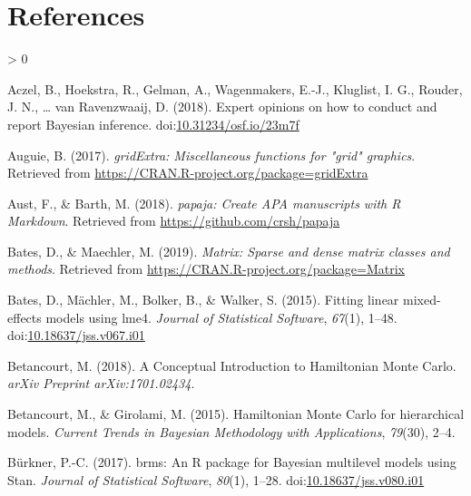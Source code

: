\documentclass[
  english,
  doc,floatsintext]{apa6}
\newlength{\cslhangindent}
\newenvironment{CSLReferences}[2] %
 {%
  \setlength{\parindent}{0pt}
  \ifodd #1 \everypar{\setlength{\hangindent}{\cslhangindent}}\ignorespaces\fi
  \ifnum #2 > 0
  \setlength{\parskip}{#2\baselineskip}
  \fi
 }%
 {}
\begin{document}
\newpage

\hypertarget{references}{%
\section{References}\label{references}}

\begingroup
\setlength{\parindent}{-0.5in}
\setlength{\leftskip}{0.2in}

\hypertarget{refs}{}
\begin{CSLReferences}{1}{0}
\leavevmode\hypertarget{ref-aczel2018expert}{}%
Aczel, B., Hoekstra, R., Gelman, A., Wagenmakers, E.-J., Kluglist, I. G., Rouder, J. N., \ldots{} van Ravenzwaaij, D. (2018). Expert opinions on how to conduct and report {Bayesian} inference. doi:\href{https://doi.org/10.31234/osf.io/23m7f}{10.31234/osf.io/23m7f}

\leavevmode\hypertarget{ref-R-gridExtra}{}%
Auguie, B. (2017). \emph{gridExtra: Miscellaneous functions for "grid" graphics}. Retrieved from \url{https://CRAN.R-project.org/package=gridExtra}

\leavevmode\hypertarget{ref-R-papaja}{}%
Aust, F., \& Barth, M. (2018). \emph{{papaja}: {Create} {APA} manuscripts with {R Markdown}}. Retrieved from \url{https://github.com/crsh/papaja}

\leavevmode\hypertarget{ref-R-Matrix}{}%
Bates, D., \& Maechler, M. (2019). \emph{Matrix: Sparse and dense matrix classes and methods}. Retrieved from \url{https://CRAN.R-project.org/package=Matrix}

\leavevmode\hypertarget{ref-R-lme4}{}%
Bates, D., Mächler, M., Bolker, B., \& Walker, S. (2015). Fitting linear mixed-effects models using {lme4}. \emph{Journal of Statistical Software}, \emph{67}(1), 1--48. doi:\href{https://doi.org/10.18637/jss.v067.i01}{10.18637/jss.v067.i01}

\leavevmode\hypertarget{ref-betancourt2018conceptual}{}%
Betancourt, M. (2018). A {Conceptual Introduction} to {Hamiltonian Monte Carlo}. \emph{arXiv Preprint arXiv:1701.02434}.

\leavevmode\hypertarget{ref-betancourt2015hamiltonian}{}%
Betancourt, M., \& Girolami, M. (2015). {Hamiltonian Monte Carlo} for hierarchical models. \emph{Current Trends in {Bayesian} Methodology with Applications}, \emph{79}(30), 2--4.

\leavevmode\hypertarget{ref-R-brms_a}{}%
Bürkner, P.-C. (2017). {brms}: An {R} package for {Bayesian} multilevel models using {Stan}. \emph{Journal of Statistical Software}, \emph{80}(1), 1--28. doi:\href{https://doi.org/10.18637/jss.v080.i01}{10.18637/jss.v080.i01}


\end{CSLReferences}
\end{document}
